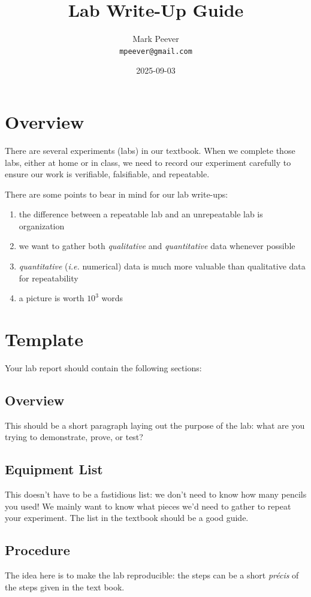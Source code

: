 \documentclass[12pt, oneside]{article}   	%
\title{Lab Write-Up Guide}
\author{Mark Peever\\ \texttt{mpeever@gmail.com}}
\date{2025-09-03}
\begin{document}
\maketitle

\section{Overview}
There are several experiments (labs) in our textbook. When we complete those labs, either at home or in class, we need to record our experiment carefully to ensure our work is verifiable, falsifiable, and repeatable. 

There are some points to bear in mind for our lab write-ups:
\begin{enumerate}
\item the difference between a repeatable lab and an unrepeatable lab is organization
\item we want to gather both \emph{qualitative} and \emph{quantitative} data whenever possible
\item \emph{quantitative} (\emph{i.e.} numerical) data is much more valuable than qualitative data for repeatability
\item a picture is worth $10^{3}$ words
\end{enumerate}

\section{Template}
Your lab report should contain the following sections:

\subsection{Overview}
This should be a short paragraph laying out the purpose of the lab: what are you trying to demonstrate, prove, or test?

\subsection{Equipment List}
This doesn't have to be a fastidious list: we don't need to know how many pencils you used! We mainly want to know what pieces we'd need to gather to repeat your experiment. The list in the textbook should be a good guide.

\subsection{Procedure}
The idea here is to make the lab reproducible: the steps can be a short \emph{pr\'{e}cis} of the steps given in the text book.
\end{document}
